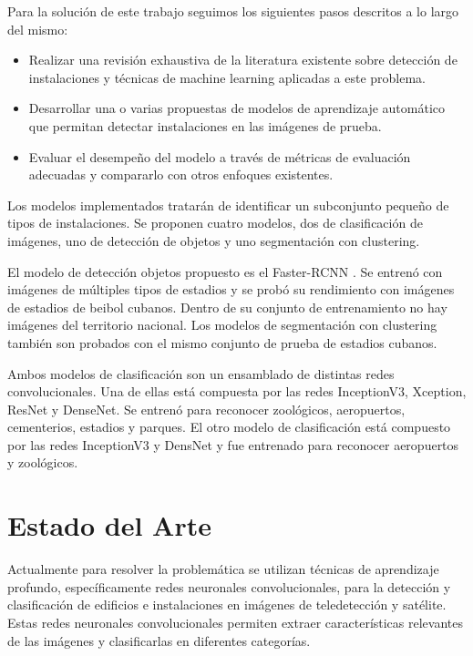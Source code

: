 \documentclass[article]{llncs}
\begin{document}
Para la solución de este trabajo seguimos los siguientes pasos descritos a lo largo del mismo:  

\begin{itemize}
    \item Realizar una revisión exhaustiva de la literatura existente sobre detección de instalaciones y técnicas de machine learning aplicadas a este problema.
    \item Desarrollar una o varias propuestas de modelos de aprendizaje automático que permitan detectar instalaciones en las imágenes de prueba.
    \item Evaluar el desempeño del modelo a través de métricas de evaluación adecuadas y compararlo con otros enfoques existentes.
\end{itemize}

Los modelos implementados tratarán de identificar un subconjunto pequeño de tipos de 
instalaciones. Se proponen cuatro modelos, dos de clasificación de imágenes, 
uno de detección de objetos y uno segmentación con clustering.

El modelo de detección objetos propuesto es el Faster-RCNN \cite{FRCNN}. Se entren\'o con im\'agenes de m\'ultiples tipos de estadios y se 
prob\'o su rendimiento con im\'agenes de estadios de beibol cubanos. Dentro de su conjunto de entrenamiento no hay im\'agenes del 
territorio nacional. Los modelos de segmentación con clustering tambi\'en son probados con el mismo conjunto de prueba de estadios cubanos.

Ambos modelos de clasificaci\'on son un ensamblado de distintas redes convolucionales. Una de ellas est\'a compuesta por las redes 
InceptionV3\cite{inceptionv3}, Xception\cite{xception}, ResNet\cite{resnet} y DenseNet\cite{densenet}. Se entren\'o para reconocer zool\'ogicos, aeropuertos, cementerios, estadios y parques. 
El otro modelo de clasificación est\'a compuesto por las redes InceptionV3 y DensNet y fue entrenado para reconocer aeropuertos y zool\'ogicos.
  

\section{Estado del Arte}
Actualmente para resolver la problemática se utilizan técnicas de aprendizaje profundo, específicamente 
redes neuronales convolucionales, para la detección y clasificación de edificios e instalaciones en imágenes de 
teledetección y satélite. Estas redes neuronales convolucionales permiten extraer características relevantes de las imágenes 
y clasificarlas en diferentes categorías.
\end{document}
